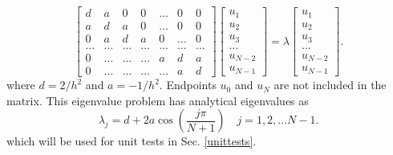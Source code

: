 \documentclass{article}
\begin{document}
\begin{equation}
\begin{bmatrix} d& a & 0   & 0    & \dots  &0     & 0 \\
a & d & a & 0    & \dots  &0     &0 \\
0   & a & d & a  &0       &\dots & 0\\
\dots  & \dots & \dots & \dots  &\dots      &\dots & \dots\\
0   & \dots & \dots & \dots  &a  &d & a\\
0   & \dots & \dots & \dots  &\dots       &a & d\end{bmatrix} 
\begin{bmatrix} u_1 \\ u_2 \\ u_3 \\ \dots \\ u_{N-2} \\ u_{N-1}\end{bmatrix} = \lambda \begin{bmatrix} u_1 \\ u_2 \\ u_3 \\ \dots \\ u_{N-2} \\ u_{N-1}\end{bmatrix} . 
\label{eq:matrixse} 
\end{equation}
where $d=2/h^2$ and $a=-1/h^2$. 
Endpoints $u_0$ and $u_N$ are not included in the matrix. 
This eigenvalue problem has analytical eigenvalues as
\begin{equation}
\label{analytical}
\lambda_j = d+2a\cos{\left(\frac{j\pi}{N+1}\right)} \quad j=1,2,\dots N-1.
\end{equation}
which will be used for unit tests in Sec. \ref{unittests}. 
\end{document}
